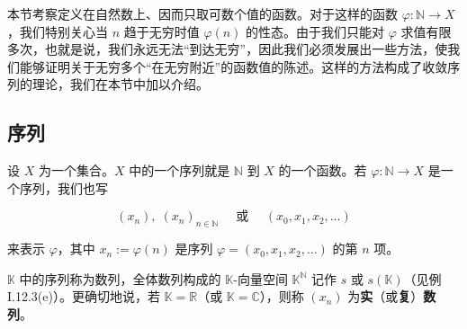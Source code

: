 本节考察定义在自然数上、因而只取可数个值的函数。对于这样的函数  $ \varphi\colon \mathbb{N} \to X $，我们特别关心当  $ n $ 趋于无穷时值  $ \varphi(n) $ 的性态。由于我们只能对  $ \varphi $ 求值有限多次，也就是说，我们永远无法“到达无穷”，因此我们必须发展出一些方法，使我们能够证明关于无穷多个“在无穷附近”的函数值的陈述。这样的方法构成了收敛序列的理论，我们在本节中加以介绍。

\subsection*{序列}

设 $X$ 为一个集合。$X$ 中的一个序列就是 $\mathbb{N}$ 到 $X$ 的一个函数。若 $\varphi: \mathbb{N} \to X$ 是一个序列，我们也写

\[
(x_{n}),\;(x_{n})_{n\in\mathbb{N}}\quad\text{ 或 }\quad(x_{0},x_{1},x_{2},\ldots)
\]

来表示  $ \varphi $，其中  $ x_n := \varphi(n) $ 是序列  $ \varphi = (x_0, x_1, x_2, \ldots) $ 的第  $ n $ 项。

$ \mathbb{K} $ 中的序列称为数列，全体数列构成的  $ \mathbb{K} $-向量空间  $ \mathbb{K}^{\mathbb{N}} $ 记作  $ s $ 或  $ s(\mathbb{K}) $（见例 I.12.3(e)）。更确切地说，若  $ \mathbb{K} = \mathbb{R} $（或  $ \mathbb{K} = \mathbb{C} $），则称  $ (x_n) $ 为\textbf{实}（或\textbf{复}）\textbf{数列}。

